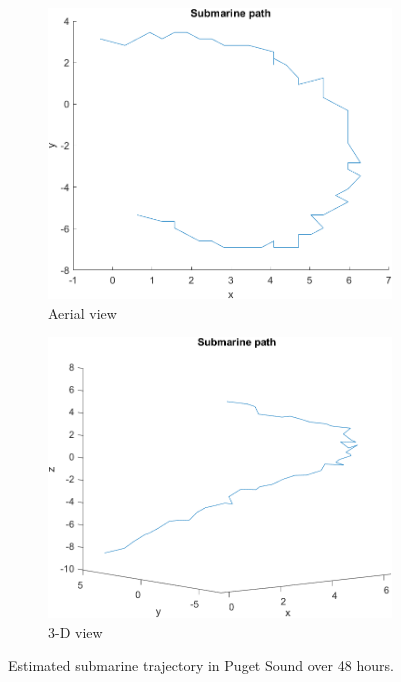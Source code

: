 \documentclass{article}
\begin{document}
\begin{figure}[!t]
	\centering
	\begin{subfigure}{.5\textwidth}
		\centering
		\includegraphics[width=0.9\linewidth]{figs/path_xy}    	
		\caption{Aerial view}
	\end{subfigure}%
	\begin{subfigure}{.5\textwidth}
		\centering
		\includegraphics[width=0.9\linewidth]{figs/path_xyz}    	
		\caption{3-D view}
	\end{subfigure}
	\caption{Estimated submarine trajectory in Puget Sound over 48 hours.}
	\label{fig:trajectory}
\end{figure}
\end{document}
